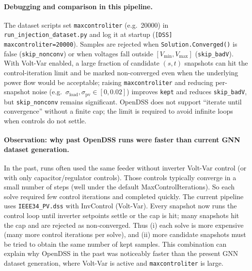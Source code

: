\documentclass[11pt]{article}
\begin{document}
\paragraph{Debugging and comparison in this pipeline.}
The dataset scripts set \texttt{maxcontroliter} (e.g.\ 20000) in \texttt{run\_injection\_dataset.py} and log it at startup (\texttt{[DSS] maxcontroliter=20000}). Samples are rejected when \texttt{Solution.Converged()} is false (\texttt{skip\_nonconv}) or when voltages fall outside $[V_{\min},V_{\max}]$ (\texttt{skip\_badV}). With Volt-Var enabled, a large fraction of candidate $(s,t)$ snapshots can hit the control-iteration limit and be marked non-converged even when the underlying power flow would be acceptable; raising \texttt{maxcontroliter} and reducing per-snapshot noise (e.g.\ $\sigma_{\mathrm{load}},\sigma_{\mathrm{pv}}\in[0,0.02]$) improves \texttt{kept} and reduces \texttt{skip\_badV}, but \texttt{skip\_nonconv} remains significant. OpenDSS does not support ``iterate until convergence'' without a finite cap; the limit is required to avoid infinite loops when controls do not settle.

\paragraph{Observation: why past OpenDSS runs were faster than current GNN dataset generation.}
In the past, runs often used the same feeder without inverter Volt-Var control (or with only capacitor/regulator controls). Those controls typically converge in a small number of steps (well under the default MaxControlIterations). So each solve required few control iterations and completed quickly. The current pipeline uses \texttt{IEEE34\_PV.dss} with InvControl (Volt-Var). Every snapshot now runs the control loop until inverter setpoints settle or the cap is hit; many snapshots hit the cap and are rejected as non-converged. Thus (i) each solve is more expensive (many more control iterations per solve), and (ii) more candidate snapshots must be tried to obtain the same number of kept samples. This combination can explain why OpenDSS in the past was noticeably faster than the present GNN dataset generation, where Volt-Var is active and \texttt{maxcontroliter} is large.
\end{document}

